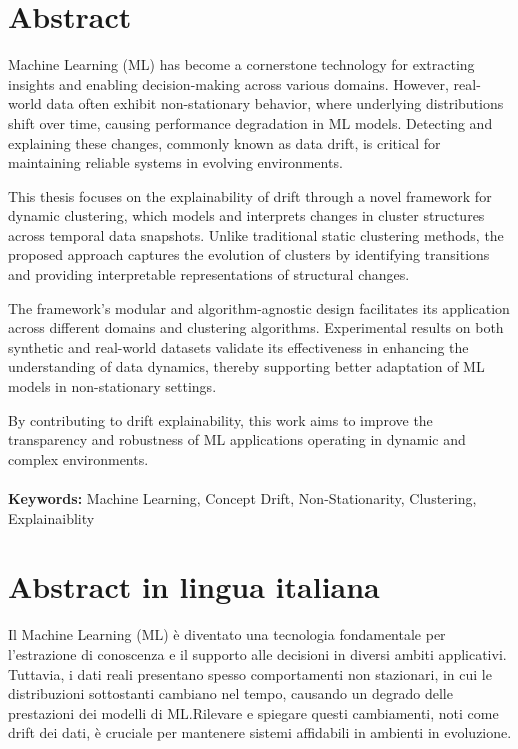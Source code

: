 
\chapter*{Abstract}
Machine Learning (ML) has become a cornerstone technology for extracting insights
and enabling decision-making across various domains. However, real-world data
often exhibit non-stationary behavior, where underlying distributions shift over
time, causing performance degradation in ML models. Detecting and explaining
these changes, commonly known as data drift, is critical for maintaining
reliable systems in evolving environments.

This thesis focuses on the explainability of drift through a novel framework
for dynamic clustering, which models and interprets changes in cluster
structures across temporal data snapshots. Unlike traditional static clustering
methods, the proposed approach captures the evolution of clusters by
identifying transitions and providing interpretable representations of
structural changes.

The framework's modular and algorithm-agnostic design facilitates its
application across different domains and clustering algorithms. Experimental
results on both synthetic and real-world datasets validate its effectiveness in
enhancing the understanding of data dynamics, thereby supporting better
adaptation of ML models in non-stationary settings.

By contributing to drift explainability, this work aims to improve the
transparency and robustness of ML applications operating in dynamic and complex
environments. \\ \\ \textbf{Keywords:} Machine Learning, Concept Drift,
Non-Stationarity, Clustering, Explainaiblity %


\chapter*{Abstract in lingua italiana}
Il Machine Learning (ML) è diventato una tecnologia fondamentale per l'estrazione 
di conoscenza e il supporto alle decisioni in diversi ambiti applicativi. 
Tuttavia, i dati reali presentano spesso comportamenti non stazionari, in cui le 
distribuzioni sottostanti cambiano nel tempo, causando un degrado delle 
prestazioni dei modelli di ML.\@ Rilevare e spiegare questi cambiamenti, noti come 
drift dei dati, è cruciale per mantenere sistemi affidabili in ambienti in 
evoluzione.

